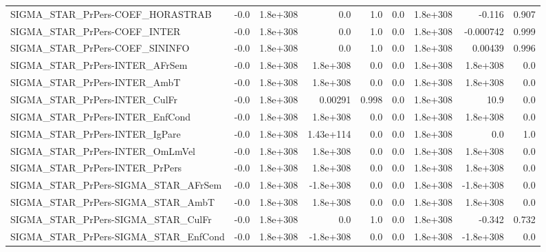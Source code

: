\begin{tabular}{lrrrrrrrr}
SIGMA\_STAR\_PrPers-COEF\_HORASTRAB      &        -0.0 &     1.8e+308 &        0.0 &      1.0 &        0.0 &    1.8e+308 &       -0.116 &         0.907 \\
SIGMA\_STAR\_PrPers-COEF\_INTER          &        -0.0 &     1.8e+308 &        0.0 &      1.0 &        0.0 &    1.8e+308 &    -0.000742 &         0.999 \\
SIGMA\_STAR\_PrPers-COEF\_SININFO        &        -0.0 &     1.8e+308 &        0.0 &      1.0 &        0.0 &    1.8e+308 &      0.00439 &         0.996 \\
SIGMA\_STAR\_PrPers-INTER\_AFrSem        &        -0.0 &     1.8e+308 &   1.8e+308 &      0.0 &        0.0 &    1.8e+308 &     1.8e+308 &           0.0 \\
SIGMA\_STAR\_PrPers-INTER\_AmbT          &        -0.0 &     1.8e+308 &   1.8e+308 &      0.0 &        0.0 &    1.8e+308 &     1.8e+308 &           0.0 \\
SIGMA\_STAR\_PrPers-INTER\_CulFr         &        -0.0 &     1.8e+308 &    0.00291 &    0.998 &        0.0 &    1.8e+308 &         10.9 &           0.0 \\
SIGMA\_STAR\_PrPers-INTER\_EnfCond       &        -0.0 &     1.8e+308 &   1.8e+308 &      0.0 &        0.0 &    1.8e+308 &     1.8e+308 &           0.0 \\
SIGMA\_STAR\_PrPers-INTER\_IgPare        &        -0.0 &     1.8e+308 &  1.43e+114 &      0.0 &        0.0 &    1.8e+308 &          0.0 &           1.0 \\
SIGMA\_STAR\_PrPers-INTER\_OmLmVel       &        -0.0 &     1.8e+308 &   1.8e+308 &      0.0 &        0.0 &    1.8e+308 &     1.8e+308 &           0.0 \\
SIGMA\_STAR\_PrPers-INTER\_PrPers        &        -0.0 &     1.8e+308 &   1.8e+308 &      0.0 &        0.0 &    1.8e+308 &     1.8e+308 &           0.0 \\
SIGMA\_STAR\_PrPers-SIGMA\_STAR\_AFrSem   &        -0.0 &     1.8e+308 &  -1.8e+308 &      0.0 &        0.0 &    1.8e+308 &    -1.8e+308 &           0.0 \\
SIGMA\_STAR\_PrPers-SIGMA\_STAR\_AmbT     &        -0.0 &     1.8e+308 &   1.8e+308 &      0.0 &        0.0 &    1.8e+308 &     1.8e+308 &           0.0 \\
SIGMA\_STAR\_PrPers-SIGMA\_STAR\_CulFr    &        -0.0 &     1.8e+308 &        0.0 &      1.0 &        0.0 &    1.8e+308 &       -0.342 &         0.732 \\
SIGMA\_STAR\_PrPers-SIGMA\_STAR\_EnfCond  &        -0.0 &     1.8e+308 &  -1.8e+308 &      0.0 &        0.0 &    1.8e+308 &    -1.8e+308 &           0.0 \\

\end{tabular}
